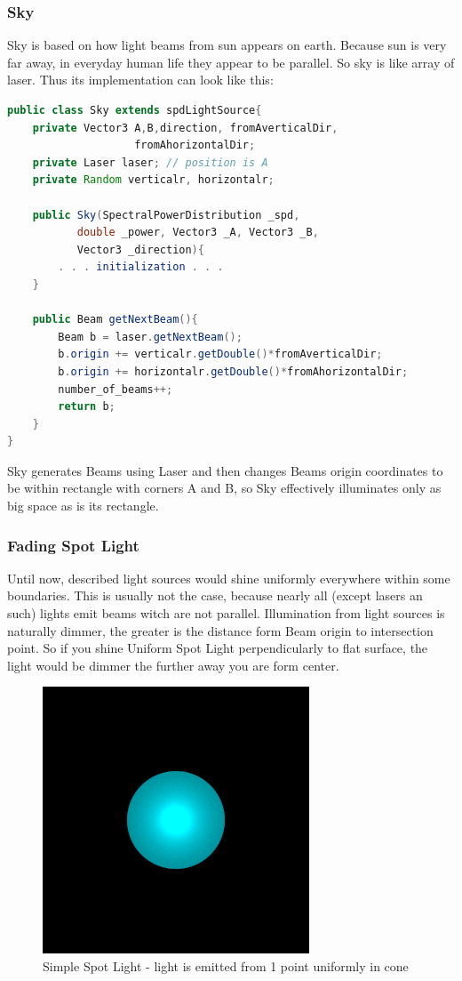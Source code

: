 \documentclass[12pt, letterpaper]{article}
\begin{document}
\subsubsection{Sky}
Sky is based on how light beams from sun appears on earth. Because sun is very far away, in everyday human life they appear to be parallel. So sky is like array of laser. Thus its implementation can look like this:
\begin{lstlisting}[language=Java]
public class Sky extends spdLightSource{
	private Vector3 A,B,direction, fromAverticalDir, 
	                fromAhorizontalDir;
	private Laser laser; // position is A
	private Random verticalr, horizontalr;	
		
	public Sky(SpectralPowerDistribution _spd, 
	       double _power, Vector3 _A, Vector3 _B, 
	       Vector3 _direction){
		. . . initialization . . .
	}

	public Beam getNextBeam(){
		Beam b = laser.getNextBeam();
		b.origin += verticalr.getDouble()*fromAverticalDir;
		b.origin += horizontalr.getDouble()*fromAhorizontalDir;
		number_of_beams++;
		return b;
	}
}
\end{lstlisting}
Sky generates Beams using Laser and then changes Beams origin coordinates to be within rectangle with corners A and B, so Sky effectively illuminates only as big space as is its rectangle.

\subsubsection{Fading Spot Light}
Until now, described light sources would shine uniformly everywhere within some boundaries. This is usually not the case, because nearly all (except lasers an such) lights emit beams witch are not parallel. 
Illumination from light sources is naturally dimmer, the greater is the distance form Beam origin to intersection point. So if you shine Uniform Spot Light perpendicularly to flat surface, the light would be dimmer the further away you are form center.
\begin{figure}[H]
\centering 
\includegraphics[scale=0.5]{SSL.png}
\caption{Simple Spot Light - light is emitted from 1 point uniformly in cone}
\end{figure}
\end{document}
